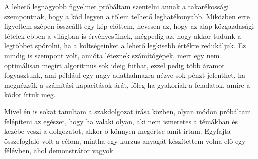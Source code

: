 \documentclass{article}
\theoremstyle{definition}
\theoremstyle{theorem}
\begin{document}
A lehető legnagyobb figyelmet próbáltam szentelni annak a takarékossági szempontnak, hogy a kód legyen a tőlem telhető leghatékonyabb. Miközben erre figyeltem szépen összeállt egy kép előttem, nevesen az, hogy az alap közgazdasági tételek ebben a világban is érvényesülnek, mégpedig az, hogy akkor tudunk a legtöbbet spórolni, ha a költségeinket a lehető legkisebb értékre redukáljuk. Ez mindig is szempont volt, amióta léteznek számítógépek, mert egy nem optimálisan megírt algoritmus sok ideig futhat, ezzel pedig több áramot fogyasztunk, ami például egy nagy adathalmazra nézve sok pénzt jelenthet, ha megnézzük a számítási kapacitások árát, főleg ha gyakoriak a feladatok, amire a kódot írtuk meg.

Mivel én is sokat tanultam a szakdolgozat írása közben, olyan módon próbáltam felépíteni az egészet, hogy ha valaki olyan, aki nem ismeretes a témákban és kezébe veszi a dolgozatot, akkor ő könnyen megértse amit írtam. Egyfajta összefoglaló volt a célom, mintha egy kurzus anyagát készítettem volna elő egy félévben, ahol demonstrátor vagyok.
\end{document}

